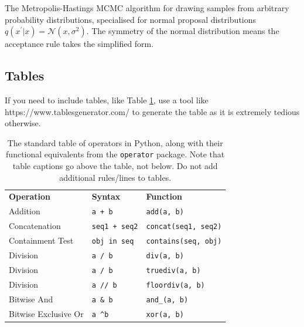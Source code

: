 \documentclass{l4proj}
\begin{document}
{\begin{algorithm}
\caption{The Metropolis-Hastings MCMC algorithm for drawing samples from arbitrary probability distributions, 
specialised for normal proposal distributions $q(x^\prime|x) = \mathcal{N}(x, \sigma^2)$. The symmetry of the normal distribution means the acceptance rule takes the simplified form.}\label{alg:metropolis}
\end{algorithm}

\subsection{Tables}

If you need to include tables, like Table \ref{tab:operators}, use a tool like https://www.tablesgenerator.com/ to generate the table as it is
extremely tedious otherwise. 

\begin{table}[]
    \caption{The standard table of operators in Python, along with their functional equivalents from the \texttt{operator} package. Note that table
    captions go above the table, not below. Do not add additional rules/lines to tables. }\label{tab:operators}
    \begin{tabular}{@{}lll@{}}
    \textbf{Operation}    & \textbf{Syntax}                & \textbf{Function}                            \\ %
    Addition              & \texttt{a + b}                          & \texttt{add(a, b)}                                    \\
    Concatenation         & \texttt{seq1 + seq2}                    & \texttt{concat(seq1, seq2)}                           \\
    Containment Test      & \texttt{obj in seq}                     & \texttt{contains(seq, obj)}                           \\
    Division              & \texttt{a / b}                          & \texttt{div(a, b) }  \\
    Division              & \texttt{a / b}                          & \texttt{truediv(a, b) } \\
    Division              & \texttt{a // b}                         & \texttt{floordiv(a, b)}                               \\
    Bitwise And           & \texttt{a \& b}                         & \texttt{and\_(a, b)}                                  \\
    Bitwise Exclusive Or  & \texttt{a \textasciicircum b}           & \texttt{xor(a, b)}                                    \\

\end{tabular}
\end{table}}
\end{document}
